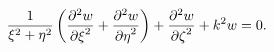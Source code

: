 \[\frac{1}{\xi^{2}+\eta^{2}}\left(\frac{{\partial}^{2}w}{{\partial\xi}^{2}}+%
\frac{{\partial}^{2}w}{{\partial\eta}^{2}}\right)+\frac{{\partial}^{2}w}{{%
\partial\zeta}^{2}}+k^{2}w=0.\]